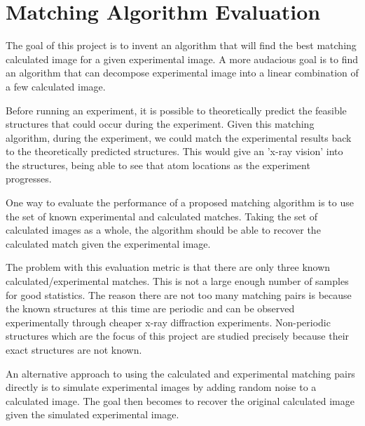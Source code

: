 \documentclass[12pt,letterpaper]{article}
\begin{document}
\clearpage

\section{Matching Algorithm Evaluation \label{s:algo_eval}}

The goal of this project is to invent an algorithm that will find the best
matching calculated image for a given experimental image. A more audacious goal
is to find an algorithm that can decompose experimental image into a linear
combination of a few calculated image.

Before running an experiment, it is possible to theoretically predict the
feasible structures that could occur during the experiment. Given this matching
algorithm, during the experiment, we could match the experimental results back
to the theoretically predicted structures. This would give an 'x-ray vision' into
the structures, being able to see that atom locations as the experiment
progresses.

One way to evaluate the performance of a proposed matching algorithm is to use
the set of known experimental and calculated matches. Taking the set of
calculated images as a whole, the algorithm should be able to recover the
calculated match given the experimental image. 

The problem with this evaluation metric is that there are only three known
calculated/experimental matches. This is not a large enough number of samples
for good statistics. The reason there are not too many matching pairs is because
the known structures at this time are periodic and can be observed
experimentally through cheaper x-ray diffraction experiments. Non-periodic
structures which are the focus of this project are studied precisely because
their exact structures are not known.

An alternative approach to using the calculated and experimental matching pairs
directly is to simulate experimental images by adding random noise to a
calculated image. The goal then becomes to recover the original calculated image
given the simulated experimental image.
\end{document}
